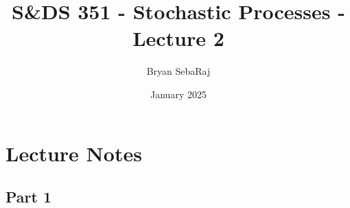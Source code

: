 \documentclass{article}
\title{S\&DS 351 - Stochastic Processes - Lecture 2}
\author{Bryan SebaRaj}
\date{January 2025}
\begin{document}
\maketitle

\section{Lecture Notes}

\subsection{Part 1}
\end{document}

